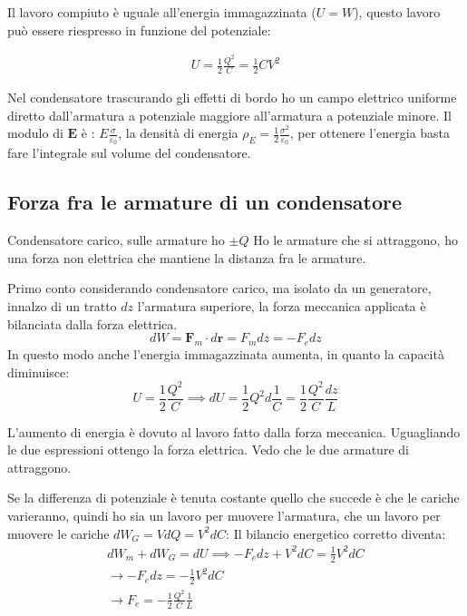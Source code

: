 \documentclass[a4paper]{scrarticle}
\begin{document}
Il lavoro compiuto è uguale all'energia immagazzinata ($U  = W$), questo lavoro può essere riespresso in funzione del potenziale:

\begin{gather*}
    U = \frac{1}{2} \frac{Q^2}{C} = \frac{1}{2} CV^2
\end{gather*}

Nel condensatore trascurando gli effetti di bordo ho un campo elettrico uniforme diretto dall'armatura a potenziale maggiore all'armatura a potenziale minore.
Il modulo di $\bm E$ è : $E \frac{\sigma}{\varepsilon_0}$, la densità di energia $\rho_E = \frac{1}{2}\frac{\sigma^2}{\varepsilon_0}$, per ottenere l'energia basta fare l'integrale sul volume del condensatore.

\subsection{Forza fra le armature di un condensatore}

Condensatore carico, sulle armature ho $\pm Q$
Ho le armature che si attraggono, ho una forza non elettrica che mantiene la distanza fra le armature.

Primo conto considerando condensatore carico, ma isolato da un generatore, innalzo di un tratto $dz$ l'armatura superiore, la forza meccanica applicata è bilanciata dalla forza elettrica.
\begin{equation*}
    dW = \bm F_m \cdot d\bm r = F_m dz = - F_e dz
\end{equation*}
In questo modo anche l'energia immagazzinata aumenta, in quanto la capacità diminuisce:
\begin{equation*}
    U = \frac{1}{2}\frac{Q^2}{C} \implies dU = \frac{1}{2}Q^2 d \frac{1}{C} = \frac{1}{2}\frac{Q^2}{C}\frac{dz}{L}
\end{equation*}

L'aumento di energia è dovuto al lavoro fatto dalla forza meccanica. Uguagliando le due espressioni ottengo la forza elettrica.
Vedo che le due armature di attraggono.

Se la differenza di potenziale è tenuta costante quello che succede è che le cariche varieranno, quindi ho sia un lavoro per muovere l'armatura, che un lavoro per muovere le cariche $dW_G = VdQ = V^2 dC$:
Il bilancio energetico corretto diventa:
\begin{gather*}
    dW_m + dW_G = dU \implies -F_edz + V^2dC = \frac{1}{2}V^2dC\\
    \to -F_e dz = -\frac{1}{2}V^2dC\\
    \to F_e = -\frac{1}{2}\frac{Q^2}{C}\frac{1}{L}
\end{gather*}
\end{document}
